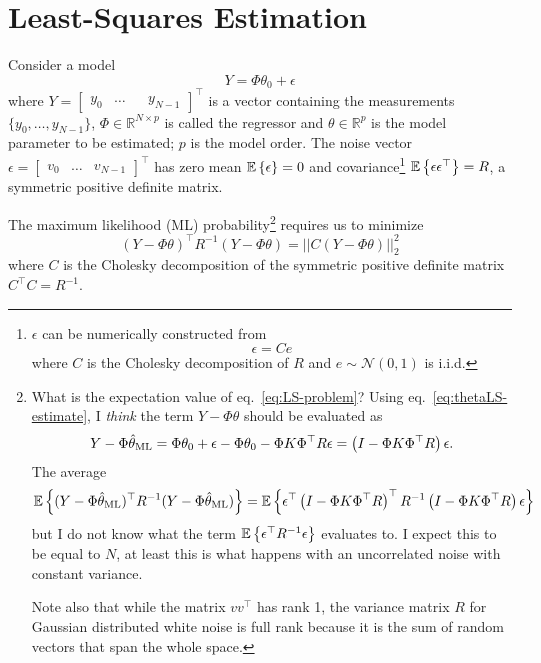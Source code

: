 \chapter{Least-Squares Estimation}
\label{chap:LS-estimation}

Consider a model
\begin{equation}
  \label{eq:LTI-with-noise}
  Y = \Phi\theta_0 + \epsilon
\end{equation}
where $Y = \begin{bmatrix}
  y_0 & \ldots && y_{N-1}
\end{bmatrix}^\top$ is a vector containing the measurements $\{y_0,\ldots, y_{N-1}\}$, $\Phi\in \mathbb{R}^{N\times p}$ is called the regressor and $\theta\in\mathbb{R}^p$ is the model parameter to be estimated; $p$ is the model order.
The noise vector $\epsilon =
\begin{bmatrix}
  v_0 & \ldots & v_{N-1}
\end{bmatrix}^\top$ has zero mean $\mathbb{E}\left\{\epsilon\right\}=0$ and covariance\footnote{$\epsilon$ can be numerically constructed from
  \begin{equation*}
    \epsilon = C e
  \end{equation*}
  where $C$ is the Cholesky decomposition of $R$ and $e\sim\mathcal{N}(0,1)$ is i.i.d.} $\mathbb{E}\left\{\epsilon \epsilon^\top\right\}=R$, a symmetric positive definite matrix.

The maximum likelihood (ML) probability\footnote{What is the expectation value of eq.~\eqref{eq:LS-problem}? Using eq.~\eqref{eq:thetaLS-estimate}, I \emph{think} the term $Y-\Phi\theta$ should be evaluated as
  \begin{equation*}
    Y-\Phi\hat{\theta}_\textrm{ML} = \Phi\theta_0 + \epsilon - \Phi\theta_0 - \Phi K \Phi^\top R\epsilon = \left(I - \Phi K \Phi^\top R\right)\epsilon.
  \end{equation*}
  The average
  \begin{equation*}
    \mathbb{E}\left\{(Y - \Phi \hat{\theta}_\textrm{ML})^\top R^{-1} (Y - \Phi \hat{\theta}_\textrm{ML})\right\} = \mathbb{E}\left\{\epsilon^\top\left(I - \Phi K \Phi^\top R\right)^\top R^{-1}\left(I - \Phi K \Phi^\top R\right)\epsilon\right\}
  \end{equation*}
  but I do not know what the term $\mathbb{E}\left\{\epsilon^\top R^{-1}\epsilon\right\}$ evaluates to. I expect this to be equal to $N$, at least this is what happens with an uncorrelated noise with constant variance.

  Note also that while the matrix $vv^\top$ has rank 1, the variance matrix $R$ for Gaussian distributed white noise is full rank because it is the sum of random vectors that span the whole space.} requires us to minimize
\begin{equation}
  \label{eq:LS-problem}
  (Y - \Phi \theta)^\top R^{-1} (Y - \Phi \theta) = ||C (Y - \Phi \theta)||_2^2
\end{equation}
where $C$ is the Cholesky decomposition of the symmetric positive definite matrix $C^\top C = R^{-1}$.

